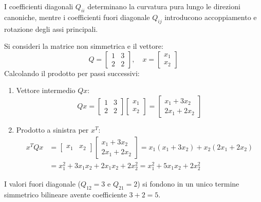 I coefficienti diagonali $Q_{ii}$ determinano la curvatura pura lungo le direzioni canoniche, mentre i coefficienti fuori diagonale $Q_{ij}$ introducono accoppiamento e rotazione degli assi principali.

\begin{example}
Si consideri la matrice non simmetrica e il vettore:
\begin{equation}
Q = \begin{bmatrix} 1 & 3 \\ 2 & 2 \end{bmatrix}, \quad x = \begin{bmatrix} x_1 \\ x_2 \end{bmatrix}
\end{equation}
Calcolando il prodotto per passi successivi:
\begin{enumerate}
    \item Vettore intermedio $Qx$:
    \begin{equation}
    Qx = \begin{bmatrix} 1 & 3 \\ 2 & 2 \end{bmatrix} \begin{bmatrix} x_1 \\ x_2 \end{bmatrix} = \begin{bmatrix} x_1 + 3x_2 \\ 2x_1 + 2x_2 \end{bmatrix}
    \end{equation}
    \item Prodotto a sinistra per $x^T$:
    \begin{align}
    x^T Q x &= \begin{bmatrix} x_1 & x_2 \end{bmatrix} \begin{bmatrix} x_1 + 3x_2 \\ 2x_1 + 2x_2 \end{bmatrix} = x_1(x_1 + 3x_2) + x_2(2x_1 + 2x_2) \nonumber \\
    &= x_1^2 + 3x_1 x_2 + 2x_1 x_2 + 2x_2^2 = x_1^2 + 5x_1 x_2 + 2x_2^2
    \end{align}
\end{enumerate}
I valori fuori diagonale ($Q_{12} = 3$ e $Q_{21} = 2$) si fondono in un unico termine simmetrico bilineare avente coefficiente $3 + 2 = 5$.
\end{example}


